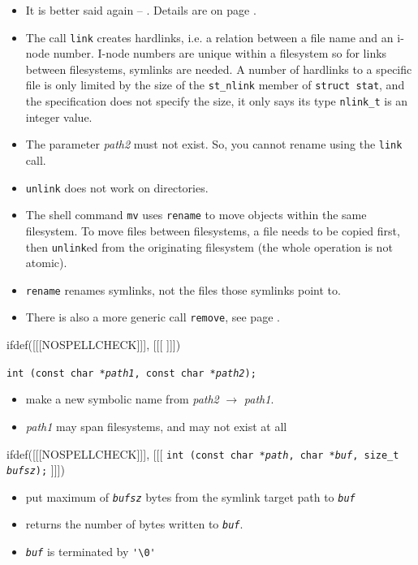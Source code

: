\begin{itemize}
\item It is better said again -- .  Details are on page \pageref{FILEDELETE}.
\item The call \texttt{link} creates hardlinks, i.e. a relation between a file
name and an i-node number.  I-node numbers are unique within a filesystem so for
links between filesystems, symlinks are needed.  A number of hardlinks to a
specific file is only limited by the size of the \texttt{st\_nlink} member of
\texttt{struct stat}, and the specification does not specify the size, it only
says its type \texttt{nlink\_t} is an integer value.
\item The parameter \emph{path2} must not exist.  So, you cannot rename using
the \texttt{link} call.
\item \texttt{unlink} does not work on directories.
\item The shell command \texttt{mv} uses \texttt{rename} to move objects within
the same filesystem.  To move files between filesystems, a file needs to be
copied first, then \texttt{unlink}ed from the originating filesystem (the whole
operation is not atomic).
\item \texttt{rename} renames symlinks, not the files those symlinks point to.
\item There is also a more generic call \texttt{remove}, see page
\pageref{REMOVE}.
\end{itemize}


ifdef([[[NOSPELLCHECK]]], [[[
]]])

\begin{slide}
\texttt{int (const char *\emph{path1},
const char *\emph{path2});}
\begin{itemize}
\item make a new symbolic name from \emph{path2} $\rightarrow$ \emph{path1}.
\item \emph{path1} may span filesystems, and may not exist at all
\end{itemize}
ifdef([[[NOSPELLCHECK]]], [[[
\texttt{int (const char *\emph{path}, char *\emph{buf},
size\_t \emph{bufsz});}
]]])
\begin{itemize}
\item put maximum of \emph{\texttt{bufsz}} bytes from the symlink target path
to \texttt{\emph{buf}}
\item returns the number of bytes written to \texttt{\emph{buf}}.
\item \texttt{\emph{buf}} is  terminated by \verb#'\0'#
\end{itemize}
\end{slide}

